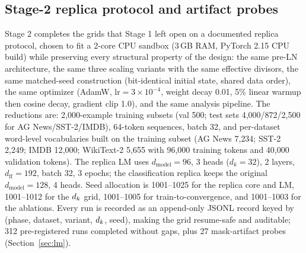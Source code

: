 \subsection{Stage-2 replica protocol and artifact probes}\label{sec:replica-protocol}
Stage 2 completes the grids that Stage 1 left open on a documented replica
protocol, chosen to fit a 2-core CPU sandbox (3\,GB RAM, PyTorch 2.15 CPU
build) while preserving every structural property of the design: the same
pre-LN architecture, the same three scaling variants with the same effective
divisors, the same matched-seed construction (bit-identical initial state,
shared data order), the same optimizer (AdamW, $\mathrm{lr}=3\times10^{-4}$,
weight decay 0.01, 5\% linear warmup then cosine decay, gradient clip 1.0),
and the same analysis pipeline. The reductions are: 2{,}000-example training
subsets (val 500; test sets 4{,}000/872/2{,}500 for AG News/SST-2/IMDB),
64-token sequences, batch 32, and per-dataset word-level vocabularies built on
the training subset (AG News 7{,}234; SST-2 2{,}249; IMDB 12{,}000; WikiText-2
5{,}655 with 96{,}000 training tokens and 40{,}000 validation tokens). The
replica LM uses $d_{\text{model}}{=}96$, 3 heads ($d_k{=}32$), 2 layers,
$d_{\text{ff}}{=}192$, batch 32, 3 epochs; the classification replica keeps the
original $d_{\text{model}}{=}128$, 4 heads. Seed allocation is 1001--1025 for
the replica core and LM, 1001--1012 for the $d_k$ grid, 1001--1005 for
train-to-convergence, and 1001--1003 for the ablations. Every run is recorded
as an append-only JSONL record keyed by (phase, dataset, variant, $d_k$, seed),
making the grid resume-safe and auditable; 312 pre-registered runs completed
without gaps, plus 27 mask-artifact probes (Section~\ref{sec:lm}).

